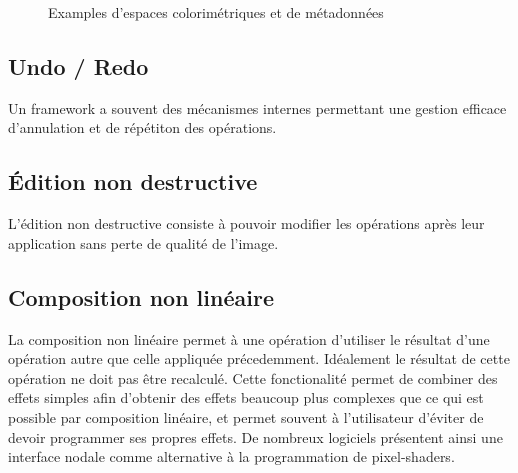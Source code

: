 			\begin{figure}[h]
				\centering
				\caption{Examples d'espaces colorimétriques et de métadonnées}
				\label{fig:color}
			\end{figure}

		\subsection{Undo / Redo}
			Un framework a souvent des mécanismes internes permettant une gestion efficace d'annulation et de répétiton des opérations.
		\subsection{Édition non destructive}
			L'édition non destructive consiste à pouvoir modifier les opérations après leur application sans perte de qualité de l'image.
		\subsection{Composition non linéaire}
			La composition non linéaire permet à une opération d'utiliser le résultat d'une opération autre que celle appliquée précedemment. Idéalement
			le résultat de cette opération ne doit pas être recalculé. Cette fonctionalité permet de combiner des effets simples afin d'obtenir des
			effets beaucoup plus complexes que ce qui est possible par composition linéaire, et permet souvent à l'utilisateur d'éviter de devoir 
			programmer ses propres effets. De nombreux logiciels présentent ainsi une interface nodale 
			comme alternative à la programmation de pixel-shaders.

